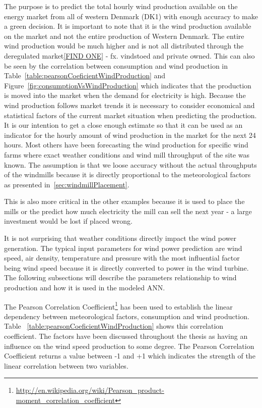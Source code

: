The purpose is to predict the total hourly wind production available on the energy market from all of western Denmark (DK1) with enough accuracy to make a green decision. It is important to note that it is the wind production available on the market and not the entire production of Western Denmark. The entire wind production would be much higher and is not all distributed through the deregulated market\ref{FIND ONE} - fx. vindstoed and private owned. This can also be seen by the correlation between consumption and wind production in Table~\ref{table:pearsonCoeficientWindProduction} and Figure~\ref{fig:consumptionVsWindProduction} which indicates that the production is moved into the market when the demand for electricity is high. Because the wind production follows market trends it is necessary to consider economical and statistical factors of the current market situation when predicting the production. It is our intention to get a close enough estimate so that it can be used as an indicator for the hourly amount of wind production in the market for the next 24 hours.
Most others have been forecasting the wind production for specific wind farms where exact weather conditions and wind mill throughput of the site was known. The assumption is that we loose accuracy without the actual throughputs of the windmills because it is directly proportional to the meteorological factors as presented in~\ref{sec:windmillPlacement}. 

This is also more critical in the other examples because it is used to place the mills or the predict how much electricity the mill can sell the next year - a large investment would be lost if placed wrong. 

It is not surprising that weather conditions directly impact the wind power generation. The typical input parameters for wind power prediction are wind speed, air density, temperature and pressure \cite{WindPowerGenerationUsingANN} with the most influential factor being wind speed because it is directly converted to power in the wind turbine. The following subsections will describe the parameters relationship to wind production and how it is used in the modeled ANN.

The Pearson Correlation Coefficient\footnote{\url{http://en.wikipedia.org/wiki/Pearson_product-moment_correlation_coefficient}} has been used to establish the linear dependency between meteorological factors, consumption and wind production. Table ~\ref{table:pearsonCoeficientWindProduction} shows this correlation coefficient. The factors have been discussed throughout the thesis as having an influence on the wind speed production to some degree. The Pearson Correlation Coefficient returns a value between -1 and +1 which indicates the strength of the linear correlation between two variables.

